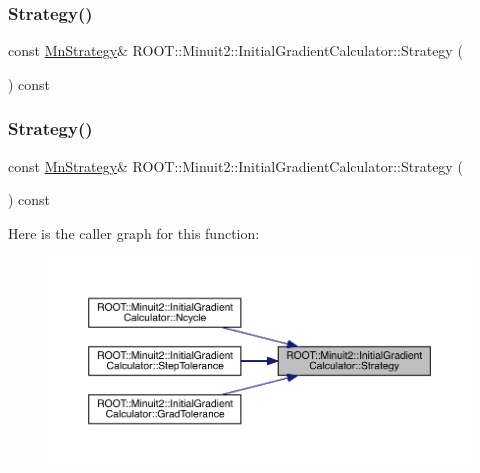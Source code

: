 \subsubsection{\texorpdfstring{Strategy()}{Strategy()}\hspace{0.1cm}{\footnotesize\ttfamily [1/2]}}
{\footnotesize\ttfamily const \mbox{\hyperlink{classROOT_1_1Minuit2_1_1MnStrategy}{Mn\+Strategy}}\& R\+O\+O\+T\+::\+Minuit2\+::\+Initial\+Gradient\+Calculator\+::\+Strategy (\begin{DoxyParamCaption}{ }\end{DoxyParamCaption}) const\hspace{0.3cm}{\ttfamily [inline]}}

\mbox{\label{classROOT_1_1Minuit2_1_1InitialGradientCalculator_ac8fb719893c5d2959ba9d784c8c2e887}} 
\subsubsection{\texorpdfstring{Strategy()}{Strategy()}\hspace{0.1cm}{\footnotesize\ttfamily [2/2]}}
{\footnotesize\ttfamily const \mbox{\hyperlink{classROOT_1_1Minuit2_1_1MnStrategy}{Mn\+Strategy}}\& R\+O\+O\+T\+::\+Minuit2\+::\+Initial\+Gradient\+Calculator\+::\+Strategy (\begin{DoxyParamCaption}{ }\end{DoxyParamCaption}) const\hspace{0.3cm}{\ttfamily [inline]}}

Here is the caller graph for this function\+:\nopagebreak
\begin{figure}[H]
\begin{center}
\leavevmode
\includegraphics[width=350pt]{d3/dcf/classROOT_1_1Minuit2_1_1InitialGradientCalculator_ac8fb719893c5d2959ba9d784c8c2e887_icgraph}
\end{center}
\end{figure}
\mbox{\label{classROOT_1_1Minuit2_1_1InitialGradientCalculator_aba7febb81b50fd961a9f7f754413a5c9}} 
